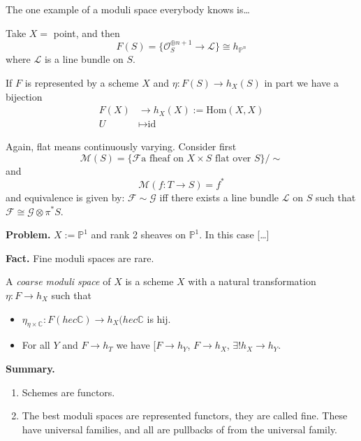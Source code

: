 \medskip\noindent

The one example of a moduli space everybody knows is…

\begin{example}
\label{example-projective-space-is-a-quotient}
Take $X=$ point, and then
$$
F(S)=\{\mathcal{O}_S^{\oplus n+1}\to \mathcal{L}\}\cong h_{\mathbb{P}^n}
$$
where $\mathcal{L}$ is a line bundle on $S$.
\end{example}

\begin{definition}
\label{definition-universal-family}
If $F$ is represented by a scheme $X$ and $\eta:F(S)\to h_X(S)$ in part we have
a bijection
\begin{align*}
F(X) &\longrightarrow h_X(X):=\text{Hom}(X,X) \\
U &\longmapsto \text{id}
\end{align*}
\end{definition}

\bigskip\noindent

Again, flat means continuously varying. Consider first
$$
\mathcal{M}(S)=\{\mathcal{F}\text{a fheaf on $X\times S$ flat over }S\}/\sim
$$
and
$$
\mathcal{M}(f:T \to S)=f^*
$$
and equivalence is given by: $\mathcal{F}\sim \mathcal{G}$ iff there exists a
line bundle $\mathcal{L}$ on $S$ such that 
$\mathcal{F}\cong \mathcal{G}\otimes\pi^*S$.

\medskip\noindent
{\bf Problem.} $X:=\mathbb{P}^1$ and rank 2 sheaves on $\mathbb{P}^1$. In this
case […]

\medskip\noindent
{\bf Fact.} Fine moduli spaces are rare.

\begin{definition}
\label{definition-coarse-moduli-space}
A {\it coarse moduli space} of  $X$ is a scheme $X$ with a natural
transformation $\eta:F \to h_X$ such that
\begin{itemize}
\item $\eta_{\eta \times \mathbb{C}}:F(hec \mathbb{C}) \to h_X(hec \mathbb{C}$
is hij.
\item For all $Y$ and $F \to h_T$ we have [$F \to h_Y$, $F\to h_X$, $\exists !
h_X \to h_Y$.
\end{itemize}
\end{definition}

\medskip\noindent
{\bf Summary.}
\begin{enumerate}
\item Schemes are functors.
\item The best moduli spaces are represented functors, they are called fine.
These have universal families, and all are pullbacks of from the
universal family.
\end{enumerate}

